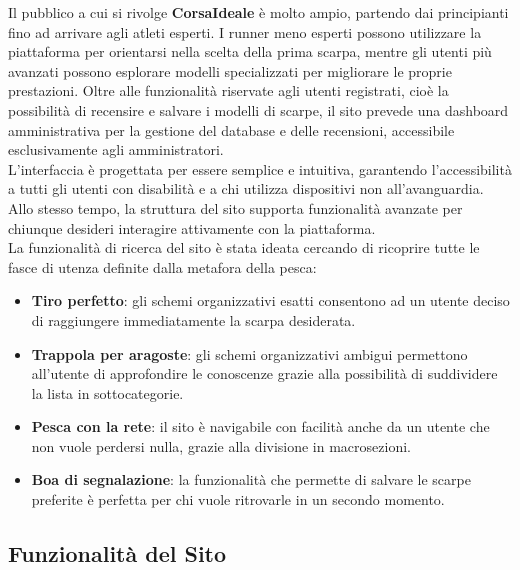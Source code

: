 \documentclass[a4paper, 12pt]{article}
\begin{document}
\begin{justify}
Il pubblico a cui si rivolge \textbf{CorsaIdeale} è molto ampio, partendo dai principianti fino ad arrivare agli atleti esperti. I runner meno esperti possono utilizzare la piattaforma per orientarsi nella scelta della prima scarpa, mentre gli utenti più avanzati possono esplorare modelli specializzati per migliorare le proprie prestazioni. Oltre alle funzionalità riservate agli utenti registrati, cioè la possibilità di recensire e salvare i modelli di scarpe, il sito prevede una dashboard amministrativa per la gestione del database e delle recensioni, accessibile esclusivamente agli amministratori.\\
L'interfaccia è progettata per essere semplice e intuitiva, garantendo l'accessibilità a tutti gli utenti con disabilità e a chi utilizza dispositivi non all'avanguardia. Allo stesso tempo, la struttura del sito supporta funzionalità avanzate per chiunque desideri interagire attivamente con la piattaforma.\\
La funzionalità di ricerca del sito è stata ideata cercando di ricoprire tutte le fasce di utenza definite dalla metafora della pesca:
\begin{itemize}
    \item \textbf{Tiro perfetto}: gli schemi organizzativi esatti consentono ad un utente deciso di raggiungere immediatamente la scarpa desiderata.
    \item \textbf{Trappola per aragoste}: gli schemi organizzativi ambigui permettono all'utente di approfondire le conoscenze grazie alla possibilità di suddividere la lista in sottocategorie.
    \item \textbf{Pesca con la rete}: il sito è navigabile con facilità anche da un utente che non vuole perdersi nulla, grazie alla divisione in macrosezioni.
    \item \textbf{Boa di segnalazione}: la funzionalità che permette di salvare le scarpe preferite è perfetta per chi vuole ritrovarle in un secondo momento.
\end{itemize}

\subsection{Funzionalità del Sito}


\end{justify}
\end{document}

